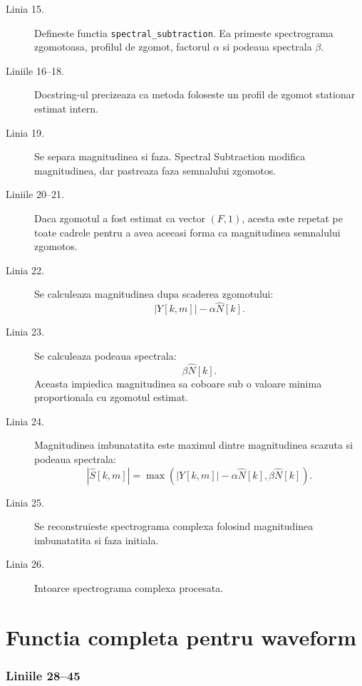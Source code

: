 \documentclass[12pt,a4paper]{report}
\newcommand{\codechunk}[2]{%
\subsection*{Liniile #1--#2}

}
\begin{document}
\begin{description}
    \item[Linia 15.] Defineste functia \texttt{spectral\_subtraction}. Ea primeste
    spectrograma zgomotoasa, profilul de zgomot, factorul \(\alpha\) si podeaua
    spectrala \(\beta\).

    \item[Liniile 16--18.] Docstring-ul precizeaza ca metoda foloseste un profil
    de zgomot stationar estimat intern.

    \item[Linia 19.] Se separa magnitudinea si faza. Spectral Subtraction modifica
    magnitudinea, dar pastreaza faza semnalului zgomotos.

    \item[Liniile 20--21.] Daca zgomotul a fost estimat ca vector \((F,1)\), acesta
    este repetat pe toate cadrele pentru a avea aceeasi forma ca magnitudinea
    semnalului zgomotos.

    \item[Linia 22.] Se calculeaza magnitudinea dupa scaderea zgomotului:
    \[
    |Y[k,m]| - \alpha\hat{N}[k].
    \]

    \item[Linia 23.] Se calculeaza podeaua spectrala:
    \[
    \beta\hat{N}[k].
    \]
    Aceasta impiedica magnitudinea sa coboare sub o valoare minima proportionala
    cu zgomotul estimat.

    \item[Linia 24.] Magnitudinea imbunatatita este maximul dintre magnitudinea
    scazuta si podeaua spectrala:
    \[
    |\hat{S}[k,m]| =
    \max(|Y[k,m]|-\alpha\hat{N}[k], \beta\hat{N}[k]).
    \]

    \item[Linia 25.] Se reconstruieste spectrograma complexa folosind magnitudinea
    imbunatatita si faza initiala.

    \item[Linia 26.] Intoarce spectrograma complexa procesata.
\end{description}

\chapter{Functia completa pentru waveform}

\codechunk{28}{45}
\end{document}
